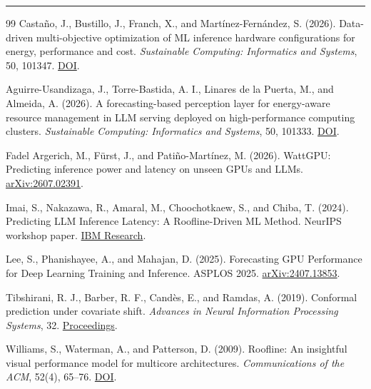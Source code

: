 \documentclass[preprint,12pt]{elsarticle}
\begin{document}
\begin{center}\rule{0.5\linewidth}{0.5pt}\end{center}
\begin{thebibliography}{99}
 Castaño, J., Bustillo, J., Franch, X., and Martínez-Fernández, S.
(2026). Data-driven multi-objective optimization of ML inference
hardware configurations for energy, performance and cost.
\emph{Sustainable Computing: Informatics and Systems}, 50, 101347.
\href{https://doi.org/10.1016/j.suscom.2026.101347}{DOI}.

 Aguirre-Usandizaga, J., Torre-Bastida, A. I., Linares de la Puerta, M.,
and Almeida, A. (2026). A forecasting-based perception layer for
energy-aware resource management in LLM serving deployed on
high-performance computing clusters. \emph{Sustainable Computing:
Informatics and Systems}, 50, 101333.
\href{https://doi.org/10.1016/j.suscom.2026.101333}{DOI}.

 Fadel Argerich, M., Fürst, J., and Patiño-Martínez, M. (2026). WattGPU:
Predicting inference power and latency on unseen GPUs and LLMs.
\href{https://arxiv.org/abs/2607.02391}{arXiv:2607.02391}.

 Imai, S., Nakazawa, R., Amaral, M., Choochotkaew, S., and Chiba, T.
(2024). Predicting LLM Inference Latency: A Roofline-Driven ML Method.
NeurIPS workshop paper.
\href{https://research.ibm.com/publications/predicting-llm-inference-latency-a-roofline-driven-ml-method}{IBM
Research}.

 Lee, S., Phanishayee, A., and Mahajan, D. (2025). Forecasting GPU
Performance for Deep Learning Training and Inference. ASPLOS 2025.
\href{https://arxiv.org/abs/2407.13853}{arXiv:2407.13853}.

 Tibshirani, R. J., Barber, R. F., Candès, E., and Ramdas, A. (2019).
Conformal prediction under covariate shift. \emph{Advances in Neural
Information Processing Systems}, 32.
\href{https://proceedings.neurips.cc/paper/2019/hash/8fb21ee7a2207526da55a679f0332de2-Abstract.html}{Proceedings}.

 Williams, S., Waterman, A., and Patterson, D. (2009). Roofline: An
insightful visual performance model for multicore architectures.
\emph{Communications of the ACM}, 52(4), 65--76.
\href{https://doi.org/10.1145/1498765.1498785}{DOI}.
\end{thebibliography}
\end{document}
